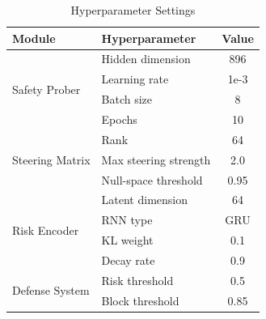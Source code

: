 
\begin{table}[h]
\centering
\caption{Hyperparameter Settings}
\label{tab:hyperparameters}
\begin{tabular}{llc}
\toprule
\textbf{Module} & \textbf{Hyperparameter} & \textbf{Value} \\
\midrule
\multirow{4}{*}{Safety Prober} 
& Hidden dimension & 896 \\
& Learning rate & 1e-3 \\
& Batch size & 8 \\
& Epochs & 10 \\
\midrule
\multirow{3}{*}{Steering Matrix}
& Rank & 64 \\
& Max steering strength & 2.0 \\
& Null-space threshold & 0.95 \\
\midrule
\multirow{4}{*}{Risk Encoder}
& Latent dimension & 64 \\
& RNN type & GRU \\
& KL weight & 0.1 \\
& Decay rate & 0.9 \\
\midrule
\multirow{2}{*}{Defense System}
& Risk threshold & 0.5 \\
& Block threshold & 0.85 \\
\bottomrule
\end{tabular}
\end{table}
